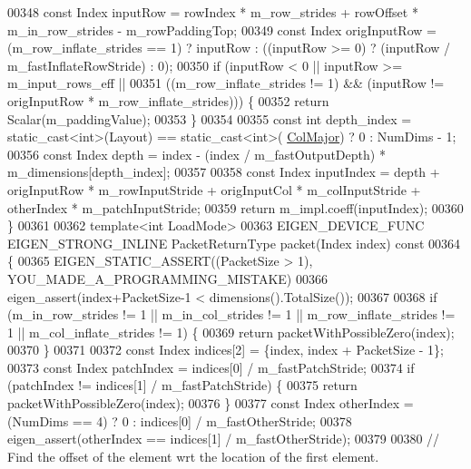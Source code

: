 \begin{DoxyCode}
00348     \textcolor{keyword}{const} Index inputRow = rowIndex * m\_row\_strides + rowOffset * m\_in\_row\_strides - m\_rowPaddingTop;
00349     \textcolor{keyword}{const} Index origInputRow = (m\_row\_inflate\_strides == 1) ? inputRow : ((inputRow >= 0) ? (inputRow / 
      m\_fastInflateRowStride) : 0);
00350     \textcolor{keywordflow}{if} (inputRow < 0 || inputRow >= m\_input\_rows\_eff ||
00351         ((m\_row\_inflate\_strides != 1) && (inputRow != origInputRow * m\_row\_inflate\_strides))) \{
00352       \textcolor{keywordflow}{return} Scalar(m\_paddingValue);
00353     \}
00354 
00355     \textcolor{keyword}{const} \textcolor{keywordtype}{int} depth\_index = \textcolor{keyword}{static\_cast<}\textcolor{keywordtype}{int}\textcolor{keyword}{>}(Layout) == static\_cast<int>(
      \hyperlink{group__enums_ggaacded1a18ae58b0f554751f6cdf9eb13a0cbd4bdd0abcfc0224c5fcb5e4f6669a}{ColMajor}) ? 0 : NumDims - 1;
00356     \textcolor{keyword}{const} Index depth = index - (index / m\_fastOutputDepth) * m\_dimensions[depth\_index];
00357 
00358     \textcolor{keyword}{const} Index inputIndex = depth + origInputRow * m\_rowInputStride + origInputCol * m\_colInputStride + 
      otherIndex * m\_patchInputStride;
00359     \textcolor{keywordflow}{return} m\_impl.coeff(inputIndex);
00360   \}
00361 
00362   \textcolor{keyword}{template}<\textcolor{keywordtype}{int} LoadMode>
00363   EIGEN\_DEVICE\_FUNC EIGEN\_STRONG\_INLINE PacketReturnType packet(Index index)\textcolor{keyword}{ const}
00364 \textcolor{keyword}{  }\{
00365     EIGEN\_STATIC\_ASSERT((PacketSize > 1), YOU\_MADE\_A\_PROGRAMMING\_MISTAKE)
00366     eigen\_assert(index+PacketSize-1 < dimensions().TotalSize());
00367 
00368     \textcolor{keywordflow}{if} (m\_in\_row\_strides != 1 || m\_in\_col\_strides != 1 || m\_row\_inflate\_strides != 1 || 
      m\_col\_inflate\_strides != 1) \{
00369       \textcolor{keywordflow}{return} packetWithPossibleZero(index);
00370     \}
00371 
00372     \textcolor{keyword}{const} Index indices[2] = \{index, index + PacketSize - 1\};
00373     \textcolor{keyword}{const} Index patchIndex = indices[0] / m\_fastPatchStride;
00374     \textcolor{keywordflow}{if} (patchIndex != indices[1] / m\_fastPatchStride) \{
00375       \textcolor{keywordflow}{return} packetWithPossibleZero(index);
00376     \}
00377     \textcolor{keyword}{const} Index otherIndex = (NumDims == 4) ? 0 : indices[0] / m\_fastOtherStride;
00378     eigen\_assert(otherIndex == indices[1] / m\_fastOtherStride);
00379 
00380     \textcolor{comment}{// Find the offset of the element wrt the location of the first element.}

\end{DoxyCode}
